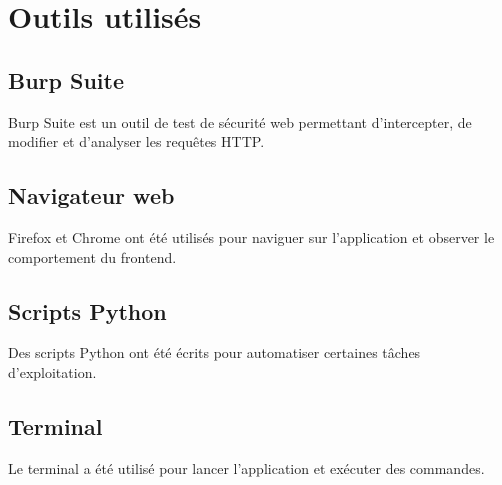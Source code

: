 
\chapter{Outils utilisés}

\section{Burp Suite}
Burp Suite est un outil de test de sécurité web permettant d'intercepter, de modifier et d'analyser les requêtes HTTP.

\section{Navigateur web}
Firefox et Chrome ont été utilisés pour naviguer sur l'application et observer le comportement du frontend.

\section{Scripts Python}
Des scripts Python ont été écrits pour automatiser certaines tâches d'exploitation.

\section{Terminal}
Le terminal a été utilisé pour lancer l'application et exécuter des commandes.
